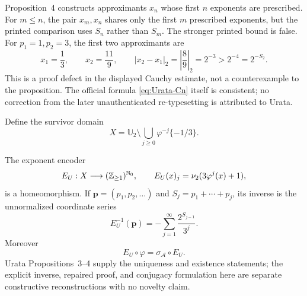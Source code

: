 \begin{sourceissue}
\label{issue:Urata-prop4-bound}
Proposition~4 constructs approximants $x_n$ whose first $n$ exponents are
prescribed.  For $m\leq n$, the pair $x_m,x_n$ shares only the first $m$
prescribed exponents, but the printed comparison uses $S_n$ rather than
$S_m$.  The stronger printed bound is false.  For $p_1=1,p_2=3$, the first
two approximants are
\[
 x_1=\frac13,\qquad x_2=\frac{11}{9},\qquad
 |x_2-x_1|_2=\left|\frac89\right|_2=2^{-3}>2^{-4}=2^{-S_2}.
\]
This is a proof defect in the displayed Cauchy estimate, not a counterexample
to the proposition.  The official formula \eqref{eq:Urata-Cn} itself is
consistent; no correction from the later unauthenticated re-typesetting is
attributed to Urata.
\end{sourceissue}

Define the survivor domain
\begin{equation}
\label{eq:Urata-survivor}
 X=\mathbb U_2\setminus
 \bigcup_{j\geq0}\varphi^{-j}\{-1/3\}.
\end{equation}

\begin{theorem}
\label{thm:Urata-countable-conjugacy}
The exponent encoder
\begin{equation}
\label{eq:Urata-exponent-encoder}
 E_U:X\longrightarrow(\mathbb{Z}_{\geq1})^{\mathbb{N}_{0}},
 \qquad
 E_U(x)_j=\nu_{2}(3\varphi^j(x)+1),
\end{equation}
is a homeomorphism.  If
$\mathbf p=(p_1,p_2,\ldots)$ and
$S_j=p_1+\cdots+p_j$, its inverse is the unnormalized coordinate series
\begin{equation}
\label{eq:Urata-explicit-inverse}
 E_U^{-1}(\mathbf p)
 =-\sum_{j=1}^{\infty}\frac{2^{S_{j-1}}}{3^j}.
\end{equation}
Moreover
\begin{equation}
\label{eq:Urata-shift-conjugacy}
 E_U\circ\varphi
 =\sigma_{\mathcal A}\circ E_U.
\end{equation}
Urata Propositions~3--4 supply the uniqueness and existence statements; the
explicit inverse, repaired proof, and conjugacy formulation here are separate
constructive reconstructions with no novelty claim.
\end{theorem}

